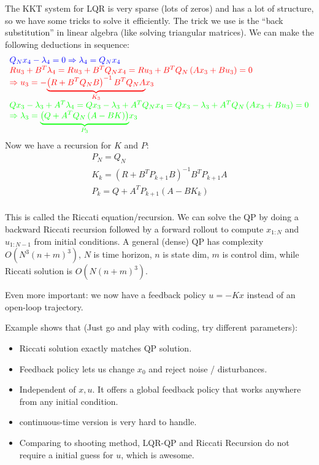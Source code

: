 The KKT system for LQR is very sparse (lots of zeros) and has a lot of structure, so we have some tricks to solve it efficiently. The trick we use is the ``back substitution'' in linear algebra (like solving triangular matrices). We can make the following deductions in sequence:
\begin{equation}
    \centering
    \begin{array}{l}
        \textcolor{blue}{Q_Nx_4-\lambda _4=0\Rightarrow \lambda _4=Q_Nx_4}\\
        \textcolor{red}{Ru_3+B^T\lambda _4=Ru_3+B^TQ_Nx_4=Ru_3+B^TQ_N\left( Ax_3+Bu_3 \right) =0}\\
        \textcolor{red}{\Rightarrow u_3=-\underset{K_3}{\underbrace{\left( R+B^TQ_NB \right) ^{-1}B^TQ_NA}}x_3}\\
        \textcolor{green}{Qx_3-\lambda _3+A^T\lambda _4=Qx_3-\lambda _3+A^TQ_Nx_4=Qx_3-\lambda _3+A^TQ_N\left( Ax_3+Bu_3 \right) =0}\\
        \textcolor{green}{\Rightarrow \lambda _3=\underset{P_3}{\underbrace{\left( Q+A^TQ_N\left( A-BK \right) \right) }}x_3}\\
    \end{array}
\end{equation}
Now we have a recursion for $K$ and $P$:
\begin{equation}
    \begin{aligned}
        P_N=Q_N\\
        K_k=\left( R+B^TP_{k+1}B \right) ^{-1}B^TP_{k+1}A\\
        P_k=Q+A^TP_{k+1}\left( A-BK_k \right)\\
    \end{aligned}
    \label{equ:riccati-recursion}
\end{equation}

This is called the Riccati equation/recursion. We can solve the QP by doing a backward Riccati recursion followed by a forward rollout to compute $x_{1:N}$ and $u_{1:N-1}$ from initial conditions. A general (dense) QP has complexity $O(N^3(n+m)^3)$, $N$ is time horizon, $n$ is state dim, $m$ is control dim, while Riccati solution is $O(N(n+m)^3)$.

Even more important: we now have a feedback policy $u=-Kx$ instead of an open-loop trajectory. 

Example shows that (Just go and play with coding, try different parameters):
\begin{itemize}
    \item Riccati solution exactly matches QP solution.
    \item Feedback policy lets us change $x_0$ and reject noise / disturbances.
    \item Independent of $x,u$. It offers a global feedback policy that works anywhere from any initial condition.
    \item continuous-time version is very hard to handle.
    \item Comparing to shooting method, LQR-QP and Riccati Recursion do not require a initial guess for $u$, which is awesome.
\end{itemize}

